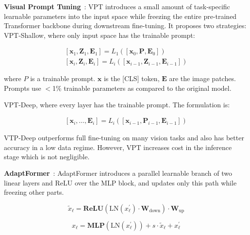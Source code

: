 {\bf Visual Prompt Tuning}~\citep{jia2022visual}: VPT introduces a small amount of task-specific learnable parameters into the input space while freezing the entire pre-trained Transformer backbone during downstream fine-tuning. It proposes two strategies: VPT-Shallow, where only input space has the trainable prompt:

\begin{equation}
\begin{array}{l} {\left[\mathbf{x}_{1}, \mathbf{Z}_{1}, \mathbf{E}_{1}\right] }=L_{1}\left(\left[\mathbf{x}_{0}, \mathbf{P}, \mathbf{E}_{0}\right]\right) \\ {\left[\mathbf{x}_{i}, \mathbf{Z}_{i}, \mathbf{E}_{i}\right] }=L_{i}\left(\left[\mathbf{x}_{i-1}, \mathbf{Z}_{i-1}, \mathbf{E}_{i-1}\right]\right) \end{array}
\end{equation}

  
where $P$ is a trainable prompt. $\mathbf{x}$ is the [CLS] token, $\mathbf E$ are the image patches. Prompts use $<$1\% trainable parameters as compared to the original model.

VPT-Deep, where every layer has the trainable prompt. The formulation is:

\begin{equation}
\begin{array}{l} {\left[\mathbf{x}_{i}, \ldots, \mathbf{E}_{i}\right] }=L_{i}\left(\left[\mathbf{x}_{i-1}, \mathbf{P}_{i-1}, \mathbf{E}_{i-1}\right]\right) \end{array}
\end{equation}

  
VTP-Deep outperforms full fine-tuning on many vision tasks and also has better accuracy in a low data regime. However, VPT increases cost in the inference stage which is not negligible. 

{\bf AdaptFormer}~\citep{chen2022adaptformer}: AdaptFormer introduces a parallel learnable branch of two linear layers and ReLU over the MLP block, and updates only this path while freezing other parts.

\begin{equation}
\tilde{x}_{\ell}=\mathbf{ReLU}\left(\mathrm{LN}\left(x_{\ell}^{\prime}\right) \cdot \mathbf{W}_{\mathrm{down }}\right) \cdot \mathbf{W}_{\mathrm{up }}
\end{equation}

\begin{equation}
x_{\ell}=\mathbf{MLP}\left(\mathrm{LN}\left(x_{\ell}^{\prime}\right)\right)+s \cdot \tilde{x}_{\ell}+x_{\ell}^{\prime}
\end{equation}

